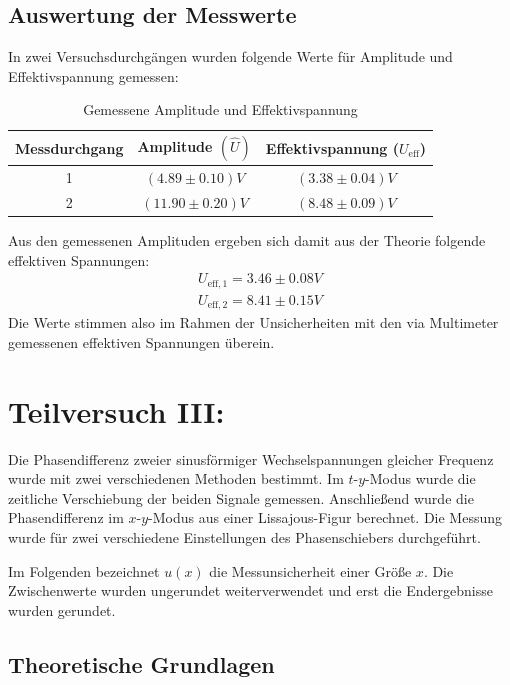 \documentclass{report}
\begin{document}
\subsection{Auswertung der Messwerte}
In zwei Versuchsdurchgängen wurden folgende Werte für Amplitude und Effektivspannung gemessen:
\begin{table}[H]
    \centering    
    \label{tab:AmpUeff}
    \begin{tabular}{c || c | c}
        Messdurchgang  & Amplitude $(\hat{U})$ & Effektivspannung ($U_\mathrm{eff}$) \\
        \hline
        1 & $(4.89 \pm 0.10) \si{V}$ & $(3.38 \pm 0.04) \si{V}$\\
        2 & $(11.90 \pm 0.20) \si{V}$ & $(8.48 \pm 0.09) \si{V}$ \\
    \end{tabular}
    \caption{Gemessene Amplitude und Effektivspannung}
\end{table}
\noindent
Aus den gemessenen Amplituden ergeben sich damit aus der Theorie folgende effektiven Spannungen:
\begin{equation}
    \begin{split}
        U_{\mathrm{eff, 1}} = 3.46 \pm 0.08 \si{V} \\
        U_{\mathrm{eff, 2}} = 8.41 \pm 0.15 \si{V}
    \end{split}
\end{equation}
Die Werte stimmen also im Rahmen der Unsicherheiten mit den via Multimeter gemessenen effektiven Spannungen überein.

\newpage
\section{Teilversuch III: }
Die Phasendifferenz zweier sinusförmiger Wechselspannungen gleicher Frequenz wurde mit zwei verschiedenen Methoden bestimmt. Im $t$-$y$-Modus wurde die zeitliche Verschiebung der beiden Signale gemessen. Anschließend wurde die Phasendifferenz im $x$-$y$-Modus aus einer Lissajous-Figur berechnet. Die Messung wurde für zwei verschiedene Einstellungen des Phasenschiebers durchgeführt.

\noindent
Im Folgenden bezeichnet $u(x)$ die Messunsicherheit einer Größe $x$. Die Zwischenwerte wurden ungerundet weiterverwendet und erst die Endergebnisse wurden gerundet.

\subsection{Theoretische Grundlagen}
\end{document}
